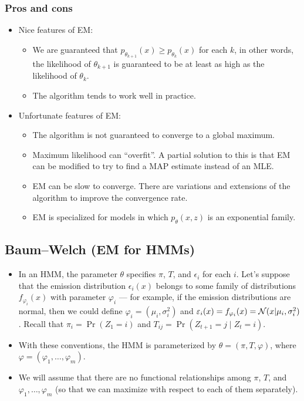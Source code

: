 \documentclass[12pt]{article}
\begin{document}
\subsubsection{Pros and cons}
\begin{itemize}
\item Nice features of EM:
\begin{itemize}
\item We are guaranteed that $p_{\theta_{k +1}}(x) \geq p_{\theta_k}(x)$ for each $k$, in other words, the likelihood of $\theta_{k +1}$ is guaranteed to be at least as high as the likelihood of $\theta_k$.
\item The algorithm tends to work well in practice.
\end{itemize}
\item Unfortunate features of EM:
\begin{itemize}
\item The algorithm is not guaranteed to converge to a global maximum.
\item Maximum likelihood can ``overfit''. A partial solution to this is that EM can be modified to try to find a MAP estimate instead of an MLE.
\item EM can be slow to converge. There are variations and extensions of the algorithm to improve the convergence rate.
\item EM is specialized for models in which $p_\theta(x,z)$ is an exponential family.
\end{itemize}
\end{itemize}

\subsection{Baum--Welch (EM for HMMs)}

\begin{itemize}
\item In an HMM, the parameter $\theta$ specifies $\pi$, $T$, and $\epsilon_i$ for each $i$. Let's suppose that the emission distribution $\epsilon_i(x)$ belongs to some family of distributions $f_{\varphi_i}(x)$ with parameter $\varphi_i$ --- for example, if the emission distributions are normal, then we could define $\varphi_i = (\mu_i,\sigma_i^2)$ and $\varepsilon_i(x) = f_{\varphi_i}(x) = \mathcal{N}(x | \mu_i,\sigma_i^2)$. Recall that $\pi_i = \Pr(Z_1 = i)$ and $T_{i j} = \Pr(Z_{t +1} = j \mid Z_t = i)$. 
\item With these conventions, the HMM is parameterized by $\theta = (\pi,T,\varphi)$, where $\varphi = (\varphi_1,\ldots,\varphi_m)$.
\item We will assume that there are no functional relationships among $\pi$, $T$, and $\varphi_1,\ldots,\varphi_m$ (so that we can maximize with respect to each of them separately).
\end{itemize}
\end{document}
